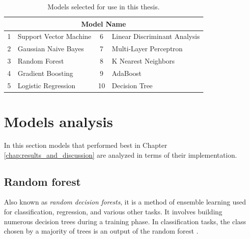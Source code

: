        \begin{table}[htbp]
            \centering
            \begin{tabular}{@{}clcl@{}}
                \toprule
                \multicolumn{4}{c}{\textbf{Model Name}} \\
                \midrule
                1 & Support Vector Machine & 6 & Linear Discriminant Analysis \\
                2 & Gaussian Naive Bayes & 7 & Multi-Layer Perceptron \\
                3 & Random Forest & 8 & K Nearest Neighbors \\
                4 & Gradient Boosting & 9 & AdaBoost \\
                5 & Logistic Regression & 10 & Decision Tree \\
                \bottomrule
            \end{tabular}
            \caption{Models selected for use in this thesis.}
            \label{tab:movements_table}
        \end{table}
    
    \section{Models analysis}
        
        In this section models that performed best in Chapter \ref{chap:results_and_discussion} are analyzed in terms of their implementation.

        \subsection{Random forest}
           Also known as \textit{random decision forests}, it is a method of ensemble learning used for classification, regression, and various other tasks. It involves building numerous decision trees during a training phase. In classification tasks, the class chosen by a majority of trees is an output of the random forest \cite{ho_random_1998}.

